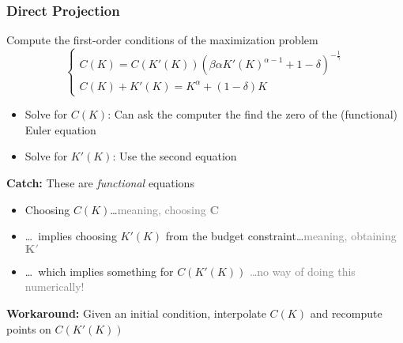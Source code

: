 \documentclass[10pt, aspectratio=1610, handout]{beamer}
\begin{document}
  \begin{frame}
    \frametitle{Direct Projection}

    Compute the first-order conditions of the maximization problem
    \begin{equation*}
      \begin{cases}
        C(K) = C(K'(K)) {\left( \beta \alpha K'(K)^{\alpha-1} + 1 - \delta \right)}^{-\frac{1}{\gamma}} \\
        C(K) + K'(K) = K^{\alpha} + (1 - \delta) K
      \end{cases}
    \end{equation*}

    \vfill\pause

    \begin{itemize}
      \item Solve for $C(K)$: Can ask the computer the find the zero of the (functional) Euler equation
      \item Solve for $K'(K)$: Use the second equation
    \end{itemize}

    \vfill\pause

    \textbf{Catch:} These are \textit{functional} equations
    \begin{itemize}
      \item Choosing $C(K)$\dots \hfill \textcolor{gray}{meaning, choosing $\mathbf{C}$}
      \item \dots\ implies choosing $K'(K)$ from the budget constraint\dots \hfill \textcolor{gray}{meaning, obtaining $\mathbf{K'}$}
      \item \dots\ which implies something for $C(K'(K))$ \hfill \textcolor{gray}{\dots no way of doing this numerically!}
    \end{itemize}

    \vfill\pause

    \textbf{Workaround:} Given an initial condition, interpolate $C(K)$ and recompute points on $C(K'(K))$

  \end{frame}
\end{document}
